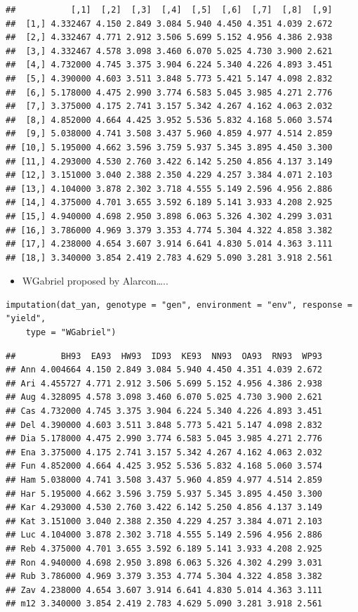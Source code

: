 \begin{verbatim}
##           [,1]  [,2]  [,3]  [,4]  [,5]  [,6]  [,7]  [,8]  [,9]
##  [1,] 4.332467 4.150 2.849 3.084 5.940 4.450 4.351 4.039 2.672
##  [2,] 4.332467 4.771 2.912 3.506 5.699 5.152 4.956 4.386 2.938
##  [3,] 4.332467 4.578 3.098 3.460 6.070 5.025 4.730 3.900 2.621
##  [4,] 4.732000 4.745 3.375 3.904 6.224 5.340 4.226 4.893 3.451
##  [5,] 4.390000 4.603 3.511 3.848 5.773 5.421 5.147 4.098 2.832
##  [6,] 5.178000 4.475 2.990 3.774 6.583 5.045 3.985 4.271 2.776
##  [7,] 3.375000 4.175 2.741 3.157 5.342 4.267 4.162 4.063 2.032
##  [8,] 4.852000 4.664 4.425 3.952 5.536 5.832 4.168 5.060 3.574
##  [9,] 5.038000 4.741 3.508 3.437 5.960 4.859 4.977 4.514 2.859
## [10,] 5.195000 4.662 3.596 3.759 5.937 5.345 3.895 4.450 3.300
## [11,] 4.293000 4.530 2.760 3.422 6.142 5.250 4.856 4.137 3.149
## [12,] 3.151000 3.040 2.388 2.350 4.229 4.257 3.384 4.071 2.103
## [13,] 4.104000 3.878 2.302 3.718 4.555 5.149 2.596 4.956 2.886
## [14,] 4.375000 4.701 3.655 3.592 6.189 5.141 3.933 4.208 2.925
## [15,] 4.940000 4.698 2.950 3.898 6.063 5.326 4.302 4.299 3.031
## [16,] 3.786000 4.969 3.379 3.353 4.774 5.304 4.322 4.858 3.382
## [17,] 4.238000 4.654 3.607 3.914 6.641 4.830 5.014 4.363 3.111
## [18,] 3.340000 3.854 2.419 2.783 4.629 5.090 3.281 3.918 2.561
\end{verbatim}


\begin{itemize}
\item WGabriel proposed by Alarcon…..
\end{itemize}
\begin{lstlisting}
imputation(dat_yan, genotype = "gen", environment = "env", response = "yield", 
    type = "WGabriel")
\end{lstlisting}

\begin{verbatim}
##         BH93  EA93  HW93  ID93  KE93  NN93  OA93  RN93  WP93
## Ann 4.004664 4.150 2.849 3.084 5.940 4.450 4.351 4.039 2.672
## Ari 4.455727 4.771 2.912 3.506 5.699 5.152 4.956 4.386 2.938
## Aug 4.328095 4.578 3.098 3.460 6.070 5.025 4.730 3.900 2.621
## Cas 4.732000 4.745 3.375 3.904 6.224 5.340 4.226 4.893 3.451
## Del 4.390000 4.603 3.511 3.848 5.773 5.421 5.147 4.098 2.832
## Dia 5.178000 4.475 2.990 3.774 6.583 5.045 3.985 4.271 2.776
## Ena 3.375000 4.175 2.741 3.157 5.342 4.267 4.162 4.063 2.032
## Fun 4.852000 4.664 4.425 3.952 5.536 5.832 4.168 5.060 3.574
## Ham 5.038000 4.741 3.508 3.437 5.960 4.859 4.977 4.514 2.859
## Har 5.195000 4.662 3.596 3.759 5.937 5.345 3.895 4.450 3.300
## Kar 4.293000 4.530 2.760 3.422 6.142 5.250 4.856 4.137 3.149
## Kat 3.151000 3.040 2.388 2.350 4.229 4.257 3.384 4.071 2.103
## Luc 4.104000 3.878 2.302 3.718 4.555 5.149 2.596 4.956 2.886
## Reb 4.375000 4.701 3.655 3.592 6.189 5.141 3.933 4.208 2.925
## Ron 4.940000 4.698 2.950 3.898 6.063 5.326 4.302 4.299 3.031
## Rub 3.786000 4.969 3.379 3.353 4.774 5.304 4.322 4.858 3.382
## Zav 4.238000 4.654 3.607 3.914 6.641 4.830 5.014 4.363 3.111
## m12 3.340000 3.854 2.419 2.783 4.629 5.090 3.281 3.918 2.561
\end{verbatim}

